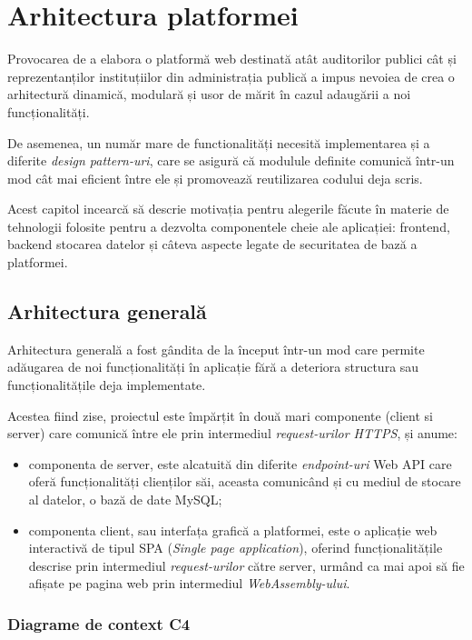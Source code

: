 \chapter{Arhitectura platformei}
 Provocarea de a elabora o platformă web destinată atât auditorilor publici cât și reprezentanților instituțiilor din administrația publică  a impus nevoiea de crea o arhitectură dinamică, modulară și usor de mărit în cazul adaugării a noi funcționalități.
 
De asemenea, un număr mare de functionalități necesită implementarea și a diferite \textit{design pattern-uri}, care se asigură că modulule definite comunică într-un mod cât mai eficient între ele și promovează reutilizarea codului deja scris.

Acest capitol incearcă să descrie motivația pentru alegerile făcute în materie de tehnologii folosite pentru a dezvolta componentele cheie ale aplicației: frontend, backend stocarea datelor și câteva aspecte legate de securitatea de bază a platformei.

\section {Arhitectura generală}
Arhitectura generală a fost gândita de la început într-un mod care permite adăugarea de noi funcționalități în aplicație fără a deteriora structura sau funcționalitățile deja implementate.

Acestea fiind zise, proiectul este împărțit în două mari componente (client si server)  care comunică între ele prin intermediul \textit{request-urilor HTTPS}, și anume:

\begin{itemize}
	
	\item componenta de server, este alcatuită din diferite \textit{endpoint-uri}  Web API care oferă funcționalități clienților săi, aceasta comunicând și cu mediul de stocare al datelor, o bază de date MySQL;
	
	\item componenta client, sau interfața grafică a platformei, este o aplicație web interactivă de tipul SPA (\textit{Single page application}), oferind funcționalitățile descrise prin intermediul \textit{request-urilor} către server, urmând ca mai apoi să fie afișate pe pagina web prin intermediul \textit{WebAssembly-ului}.
\end{itemize}  

\subsection*{Diagrame de context C4 }

